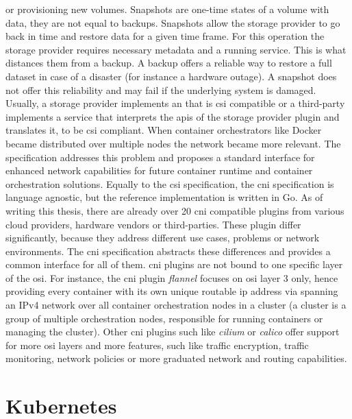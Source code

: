 \documentclass[titlepage]{report}
\begin{document}
or provisioning new volumes\cite{CSISpec}. Snapshots are one-time states of a volume with data, they are not equal to backups. Snapshots allow the storage provider
to go back in time and restore data for a given time frame. For this operation the storage provider requires necessary metadata and a running service. This is what
distances them from a backup. A backup offers a reliable way to restore a full dataset in case of a disaster (for instance a hardware outage). A snapshot does not
offer this reliability and may fail if the underlying system is damaged. Usually, a storage provider implements an  that is \gls{csi} compatible
or a third-party implements a service that interprets the \glspl{api} of the storage provider plugin and translates it, to be \gls{csi} compliant. When container orchestrators
like Docker became distributed over multiple nodes the network became more relevant. The  specification addresses this problem and proposes a standard interface
for enhanced network capabilities for future container runtime and container orchestration solutions. Equally to the \gls{csi} specification, the \gls{cni} specification is language agnostic,
but the reference implementation is written in Go\cite{CNISpec}. As of writing this thesis, there are already over 20 \gls{cni} compatible plugins from various cloud providers, hardware vendors
or third-parties. These plugin differ significantly, because they address different use cases, problems or network environments. The \gls{cni} specification abstracts these differences and provides
a common interface for all of them. \gls{cni} plugins are not bound to one specific layer of the \gls{osi}. For instance, the \gls{cni} plugin \emph{flannel} focuses on \gls{osi} layer 3 only, hence providing
every container with its own unique routable \gls{ip} address via spanning an IPv4 network over all container orchestration nodes in a cluster (a cluster is a group of multiple orchestration nodes, responsible
for running containers or managing the cluster)\cite{Flannel}. Other \gls{cni} plugins such like \emph{cilium} or \emph{calico} offer support for more \gls{osi} layers and more features, such like
traffic encryption, traffic monitoring, network policies or more graduated network and routing capabilities.

\section{Kubernetes}
\end{document}
